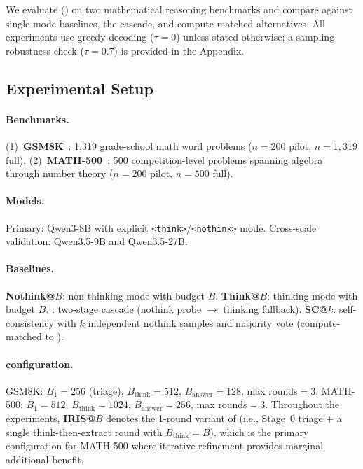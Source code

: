 
We evaluate \method{} (\fullmethod{}) on two mathematical reasoning benchmarks
and compare against single-mode baselines, the \town{} cascade, and
compute-matched alternatives.
All experiments use greedy decoding ($\tau{=}0$) unless stated otherwise;
a sampling robustness check ($\tau{=}0.7$) is provided in the Appendix.

\subsection{Experimental Setup}
\label{sec:experiments:setup}

\paragraph{Benchmarks.}
(1)~\textbf{GSM8K}~\citep{cobbe2021gsm8k}: 1{,}319 grade-school math word problems ($n{=}200$ pilot, $n{=}1{,}319$ full).
(2)~\textbf{MATH-500}~\citep{hendrycks2021math}: 500 competition-level problems spanning algebra through number theory ($n{=}200$ pilot, $n{=}500$ full).

\paragraph{Models.}
Primary: Qwen3-8B with explicit \texttt{<think>}/\texttt{<nothink>} mode.
Cross-scale validation: Qwen3.5-9B and Qwen3.5-27B.

\paragraph{Baselines.}
\textbf{Nothink@$B$}: non-thinking mode with budget $B$.
\textbf{Think@$B$}: thinking mode with budget $B$.
\textbf{\town{}}: two-stage cascade (nothink probe $\to$ thinking fallback).
\textbf{SC@$k$}: self-consistency with $k$ independent nothink samples and majority vote (compute-matched to \method{}).

\paragraph{\method{} configuration.}
GSM8K: $B_1{=}256$ (triage), $B_{\text{think}}{=}512$, $B_{\text{answer}}{=}128$, max rounds${=}3$.
MATH-500: $B_1{=}512$, $B_{\text{think}}{=}1024$, $B_{\text{answer}}{=}256$, max rounds${=}3$.
Throughout the experiments, \textbf{IRIS@$B$} denotes the 1-round variant of \method{} (i.e., Stage~0 triage + a single think-then-extract round with $B_{\text{think}}{=}B$), which is the primary configuration for MATH-500 where iterative refinement provides marginal additional benefit.

